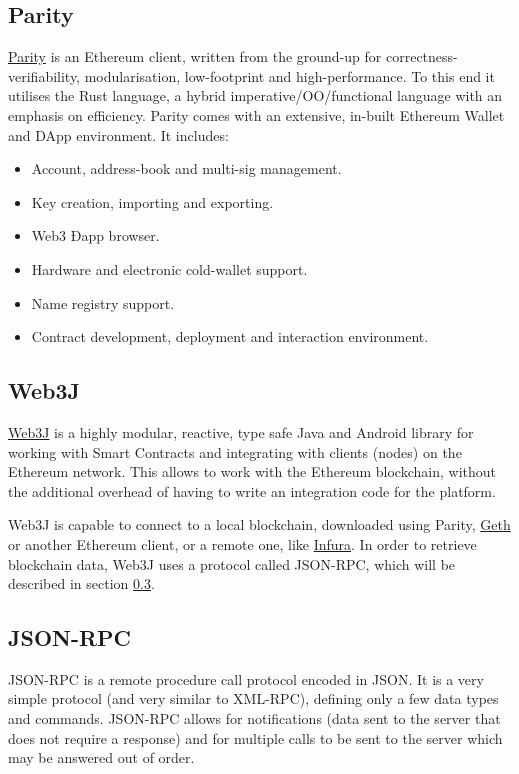 \subsection{Parity}
\label{parity}
\href{https://www.parity.io/}{Parity} \cite{authors2017ethereum} is an Ethereum client, written from the ground-up for correctness-verifiability, modularisation, low-footprint and high-performance. \newline
To this end it utilises the Rust language, a hybrid imperative/OO/functional language with an emphasis on efficiency. 
\newline
Parity comes with an extensive, in-built Ethereum Wallet and DApp environment. It includes:
\begin{itemize}
    \item Account, address-book and multi-sig management.
    \item Key creation, importing and exporting.
    \item Web3 Ðapp browser.
    \item Hardware and electronic cold-wallet support.
    \item Name registry support.
    \item Contract development, deployment and interaction environment.
\end{itemize}

\subsection{Web3J}
\label{web3j}
\href{https://web3j.io/}{Web3J} is a highly modular, reactive, type safe Java and Android library for working with Smart Contracts and integrating with clients (nodes) on the Ethereum network. This allows to work with the Ethereum blockchain, without the additional overhead of having to write an integration code for the platform.

Web3J is capable to connect to a local blockchain, downloaded using Parity, \href{https://github.com/ethereum/go-ethereum/wiki/geth}{Geth} or another Ethereum client, or a remote one, like \href{https://infura.io}{Infura}.
In order to retrieve blockchain data, Web3J uses a protocol called JSON-RPC, which will be described in section \ref{jsonrpc}. 

\subsection{JSON-RPC}
\label{jsonrpc}
JSON-RPC \cite{json2012json} is a remote procedure call protocol encoded in JSON. It is a very simple protocol (and very similar to XML-RPC), defining only a few data types and commands. JSON-RPC allows for notifications (data sent to the server that does not require a response) and for multiple calls to be sent to the server which may be answered out of order.

